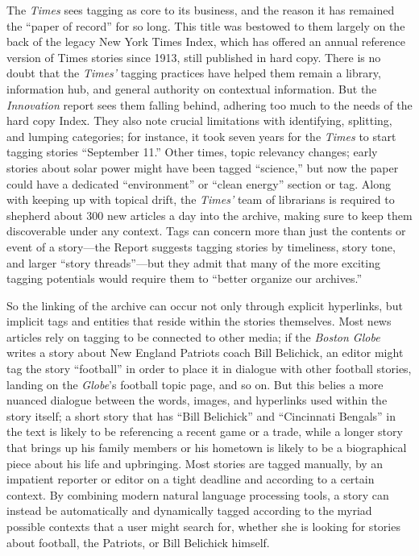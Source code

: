 The \emph{Times} sees tagging as core to its business, and the reason it has remained the ``paper of record'' for so long.\autocite[41]{_innovation_2014} This title was bestowed to them largely on the back of the legacy New York Times Index, which has offered an annual reference version of Times stories since 1913, still published in hard copy. There is no doubt that the \emph{Times'} tagging practices have helped them remain a library, information hub, and general authority on contextual information. But the \emph{Innovation} report sees them falling behind, adhering too much to the needs of the hard copy Index. They also note crucial limitations with identifying, splitting, and lumping categories; for instance, it took seven years for the \emph{Times} to start tagging stories ``September 11.'' Other times, topic relevancy changes; early stories about solar power might have been tagged ``science,'' but now the paper could have a dedicated ``environment'' or ``clean energy'' section or tag. Along with keeping up with topical drift, the \emph{Times'} team of librarians is required to shepherd about 300 new articles a day into the archive, making sure to keep them discoverable under any context. Tags can concern more than just the contents or event of a story---the Report suggests tagging stories by timeliness, story tone, and larger ``story threads''---but they admit that many of the more exciting tagging potentials would require them to ``better organize our archives.''\autocite[41-42]{_innovation_2014}

So the linking of the archive can occur not only through explicit hyperlinks, but implicit tags and entities that reside within the stories themselves. Most news articles rely on tagging to be connected to other media; if the \emph{Boston Globe} writes a story about New England Patriots coach Bill Belichick, an editor might tag the story ``football'' in order to place it in dialogue with other football stories, landing on the \emph{Globe}'s football topic page, and so on. But this belies a more nuanced dialogue between the words, images, and hyperlinks used within the story itself; a short story that has ``Bill Belichick'' and ``Cincinnati Bengals'' in the text is likely to be referencing a recent game or a trade, while a longer story that brings up his family members or his hometown is likely to be a biographical piece about his life and upbringing. Most stories are tagged manually, by an impatient reporter or editor on a tight deadline and according to a certain context. By combining modern natural language processing tools, a story can instead be automatically and dynamically tagged according to the myriad possible contexts that a user might search for, whether she is looking for stories about football, the Patriots, or Bill Belichick himself.

